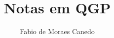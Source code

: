 \documentclass[a4paper,10pt]{article}
\title{Notas em QGP}
\author{Fabio de Moraes Canedo}
\begin{document}
\maketitle

\begin{abstract}

\end{abstract}












\blankpage





 

\end{document}
